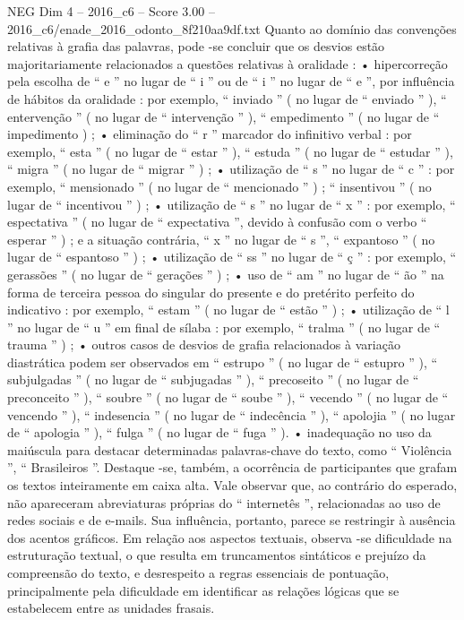 \begin{textsample}{NEG Dim 4 – 2016\_c6 – Score 3.00 – 2016\_c6/enade\_2016\_odonto\_8f210aa9df.txt}
Quanto ao domínio das convenções relativas à grafia das palavras, pode -se concluir que os desvios estão majoritariamente relacionados a questões relativas à oralidade : • hipercorreção pela escolha de “ e ” no lugar de “ i ” ou de “ i ” no lugar de “ e ”, por influência de hábitos da oralidade : por exemplo, “ inviado ” ( no lugar de “ enviado ” ), “ entervenção ” ( no lugar de “ intervenção ” ), “ empedimento ” ( no lugar de “ impedimento ) ; • eliminação do “ r ” marcador do infinitivo verbal : por exemplo, “ esta ” ( no lugar de “ estar ” ), “ estuda ” ( no lugar de “ estudar ” ), “ migra ” ( no lugar de “ migrar ” ) ; • utilização de “ s ” no lugar de “ c ” : por exemplo, “ mensionado ” ( no lugar de “ mencionado ” ) ; “ insentivou ” ( no lugar de “ incentivou ” ) ; • utilização de “ s ” no lugar de “ x ” : por exemplo, “ espectativa ” ( no lugar de “ expectativa ”, devido à confusão com o verbo “ esperar ” ) ; e a situação contrária, “ x ” no lugar de “ s ”, “ expantoso ” ( no lugar de “ espantoso ” ) ; • utilização de “ ss ” no lugar de “ ç ” : por exemplo, “ gerassões ” ( no lugar de “ gerações ” ) ; • uso de “ am ” no lugar de “ ão ” na forma de terceira pessoa do singular do presente e do pretérito perfeito do indicativo : por exemplo, “ estam ” ( no lugar de “ estão ” ) ; • utilização de “ l ” no lugar de “ u ” em final de sílaba : por exemplo, “ tralma ” ( no lugar de “ trauma ” ) ; • outros casos de desvios de grafia relacionados à variação diastrática podem ser observados em “ estrupo ” ( no lugar de “ estupro ” ), “ subjulgadas ” ( no lugar de “ subjugadas ” ), “ precoseito ” ( no lugar de “ preconceito ” ), “ soubre ” ( no lugar de “ soube ” ), “ vecendo ” ( no lugar de “ vencendo ” ), “ indesencia ” ( no lugar de “ indecência ” ), “ apolojia ” ( no lugar de “ apologia ” ), “ fulga ” ( no lugar de “ fuga ” ). • inadequação no uso da maiúscula para destacar determinadas palavras-chave do texto, como “ Violência ”, “ Brasileiros ”.
Destaque -se, também, a ocorrência de participantes que grafam os textos inteiramente em caixa alta.
Vale observar que, ao contrário do esperado, não apareceram abreviaturas próprias do “ internetês ”, relacionadas ao uso de redes sociais e de e-mails.
Sua influência, portanto, parece se restringir à ausência dos acentos gráficos.
Em relação aos aspectos textuais, observa -se dificuldade na estruturação textual, o que resulta em truncamentos sintáticos e prejuízo da compreensão do texto, e desrespeito a regras essenciais de pontuação, principalmente pela dificuldade em identificar as relações lógicas que se estabelecem entre as unidades frasais.

\end{textsample}
